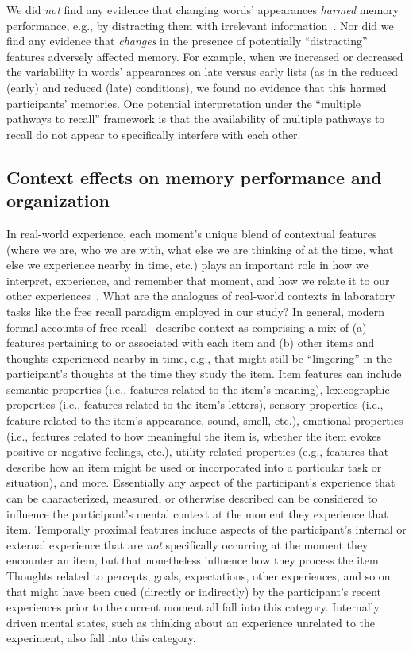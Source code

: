 \documentclass[11pt]{article}
\begin{document}
We did \textit{not} find any evidence that changing words' appearances
\textit{harmed} memory performance, e.g., by distracting them with irrelevant
information~\citep{MarsEtal15, Lang05, MarsEtal12, ReinEtal92}. Nor did we find
any evidence that \textit{changes} in the presence of potentially
``distracting'' features adversely affected memory. For example, when we
increased or decreased the variability in words' appearances on late versus
early lists (as in the reduced (early) and reduced (late) conditions), we found
no evidence that this harmed participants' memories. One potential
interpretation under the ``multiple pathways to recall'' framework is that the
availability of multiple pathways to recall do not appear to specifically
interfere with each other.

\subsection*{Context effects on memory performance and organization}

In real-world experience, each moment's unique blend of contextual features
(where we are, who we are with, what else we are thinking of at the time, what
else we experience nearby in time, etc.) plays an important role in how we
interpret, experience, and remember that moment, and how we relate it to our
other experiences~\citep[e.g., for review see ][]{Mann20}. What are the
analogues of real-world contexts in laboratory tasks like the free recall
paradigm employed in our study? In general, modern formal accounts of free
recall~\citep{Kaha20} describe context as comprising a mix of (a) features
pertaining to or associated with each item and (b) other items and thoughts
experienced nearby in time, e.g., that might still be ``lingering'' in the
participant's thoughts at the time they study the item. Item features can
include semantic properties (i.e., features related to the item's meaning),
lexicographic properties (i.e., features related to the item's letters),
sensory properties (i.e., feature related to the item's appearance, sound,
smell, etc.), emotional properties (i.e., features related to how meaningful the
item is, whether the item evokes positive or negative feelings, etc.),
utility-related properties (e.g., features that describe how an item might be
used or incorporated into a particular task or situation), and more.
Essentially any aspect of the participant's experience that can be
characterized, measured, or otherwise described can be considered to influence
the participant's mental context at the moment they experience that item.
Temporally proximal features include aspects of the participant's internal or
external experience that are \textit{not} specifically occurring at the moment
they encounter an item, but that nonetheless influence how they process the
item. Thoughts related to percepts, goals, expectations, other experiences, and
so on that might have been cued (directly or indirectly) by the participant's
recent experiences prior to the current moment all fall into this category.
Internally driven mental states, such as thinking about an experience unrelated
to the experiment, also fall into this category.
\end{document}
